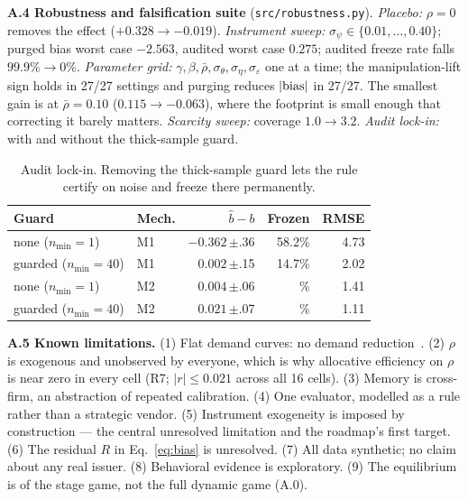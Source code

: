 \textbf{A.4 Robustness and falsification suite} (\texttt{src/robustness.py}). \emph{Placebo:} $\rho=0$ removes the effect ($+0.328\to-0.019$). \emph{Instrument sweep:} $\sigma_\psi\in\{0.01,\dots,0.40\}$; purged bias worst case $-2.563$, audited worst case $0.275$; audited freeze rate falls $99.9\%\to0\%$. \emph{Parameter grid:} $\gamma,\beta,\bar\rho,\sigma_\theta,\sigma_\eta,\sigma_\varepsilon$ one at a time; the manipulation-lift sign holds in 27/27 settings and purging reduces $|{\rm bias}|$ in 27/27. The smallest gain is at $\bar\rho=0.10$ ($0.115\to-0.063$), where the footprint is small enough that correcting it barely matters. \emph{Scarcity sweep:} coverage $1.0\to3.2$. \emph{Audit lock-in:} with and without the thick-sample guard.

\begin{table}[H]\centering\footnotesize
\caption{Audit lock-in. Removing the thick-sample guard lets the rule certify on noise and freeze there permanently.}
\label{tab:audit}
\setlength{\tabcolsep}{4pt}
\begin{tabular}{@{}llrrr@{}}\toprule
Guard & Mech. & $\hat b-b$ & Frozen & RMSE\\\midrule
none ($n_{\min}{=}1$)  & M1 & $-0.362$\,\tiny$\pm$.36 & 58.2\% & 4.73\\
guarded ($n_{\min}{=}40$) & M1 & $\;\;\,0.002$\,\tiny$\pm$.15 & 14.7\% & 2.02\\
none ($n_{\min}{=}1$)  & M2 & $\;\;\,0.004$\,\tiny$\pm$.06 & \;3.9\% & 1.41\\
guarded ($n_{\min}{=}40$) & M2 & $\;\;\,0.021$\,\tiny$\pm$.07 & \;0.0\% & 1.11\\\bottomrule
\end{tabular}
\end{table}

\textbf{A.5 Known limitations.} (1) Flat demand curves: no demand reduction~\cite{ausubel2014}. (2) $\rho$ is exogenous and unobserved by everyone, which is why allocative efficiency on $\rho$ is near zero in every cell (R7; $|r|\le0.021$ across all 16 cells). (3) Memory is cross-firm, an abstraction of repeated calibration. (4) One evaluator, modelled as a rule rather than a strategic vendor. (5) Instrument exogeneity is imposed by construction --- the central unresolved limitation and the roadmap's first target. (6) The residual $R$ in Eq.~\eqref{eq:bias} is unresolved. (7) All data synthetic; no claim about any real issuer. (8) Behavioral evidence is exploratory. (9) The equilibrium is of the stage game, not the full dynamic game (A.0).

